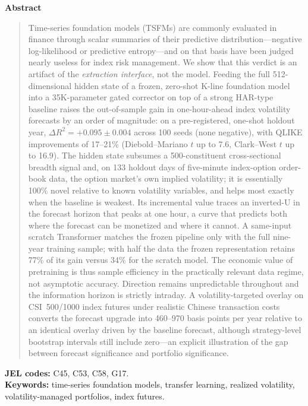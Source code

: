 \documentclass[12pt]{article}
\newcommand{\dR}{\Delta R^2}
\begin{document}
\begin{titlepage}
\vspace{10pt}
\begin{center}{\bfseries Abstract}\end{center}
\begin{quote}
\singlespacing\small
\noindent
Time-series foundation models (TSFMs) are commonly evaluated in finance through
scalar summaries of their predictive distribution---negative log-likelihood or
predictive entropy---and on that basis have been judged nearly useless for index
risk management. We show that this verdict is an artifact of the
\emph{extraction interface}, not the model. Feeding the full 512-dimensional
hidden state of a frozen, zero-shot K-line foundation model into a
35K-parameter gated corrector on top of a strong HAR-type baseline raises the
out-of-sample gain in one-hour-ahead index volatility forecasts by an order of
magnitude: on a pre-registered, one-shot holdout year,
$\dR = +0.095 \pm 0.004$ across 100 seeds (none negative), with QLIKE
improvements of 17--21\% (Diebold--Mariano $t$ up to 7.6, Clark--West $t$ up to
16.9). The hidden state subsumes a 500-constituent cross-sectional breadth
signal and, on 133 holdout days of five-minute index-option order-book data,
the option market's own implied volatility; it is essentially 100\% novel
relative to known volatility variables, and helps most exactly when the
baseline is weakest. Its incremental value traces an inverted-U in the forecast
horizon that peaks at one hour, a curve that predicts both where the forecast
can be monetized and where it cannot. A same-input scratch
Transformer matches the frozen pipeline only with the full nine-year training
sample; with half the data the frozen representation retains 77\% of its gain
versus 34\% for the scratch model. The economic value of pretraining is thus
sample efficiency in the practically relevant data regime, not asymptotic
accuracy. Direction remains unpredictable throughout and the information
horizon is strictly intraday. A volatility-targeted overlay on CSI~500/1000
index futures under realistic Chinese transaction costs converts the forecast
upgrade into 460--970 basis points per year relative to an identical overlay
driven by the baseline forecast, although strategy-level bootstrap intervals
still include zero---an explicit illustration of the gap between forecast
significance and portfolio significance.
\end{quote}

\vspace{8pt}
\noindent\textbf{JEL codes:} C45, C53, C58, G17.\\
\textbf{Keywords:} time-series foundation models, transfer learning, realized
volatility, volatility-managed portfolios, index futures.
\end{titlepage}
\end{document}
